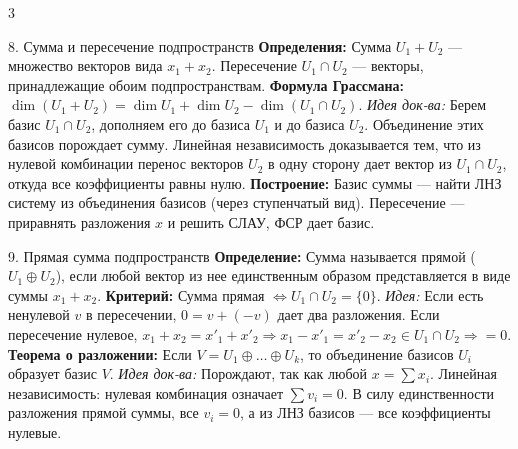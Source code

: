 \documentclass[8pt, a4paper, landscape]{extarticle}
\newcommand{\Ra}{\Rightarrow}
\begin{document}
\begin{multicols*}{3}
\begin{ticket}{8. Сумма и пересечение подпространств}
\textbf{Определения:} Сумма $U_1 + U_2$ --- множество векторов вида $x_1 + x_2$. Пересечение $U_1 \cap U_2$ --- векторы, принадлежащие обоим подпространствам.
\textbf{Формула Грассмана:} $\dim(U_1 + U_2) = \dim U_1 + \dim U_2 - \dim(U_1 \cap U_2)$.
\tcblower
\textit{Идея док-ва:} Берем базис $U_1 \cap U_2$, дополняем его до базиса $U_1$ и до базиса $U_2$. Объединение этих базисов порождает сумму. Линейная независимость доказывается тем, что из нулевой комбинации перенос векторов $U_2$ в одну сторону дает вектор из $U_1 \cap U_2$, откуда все коэффициенты равны нулю.
\textbf{Построение:} Базис суммы --- найти ЛНЗ систему из объединения базисов (через ступенчатый вид). Пересечение --- приравнять разложения $x$ и решить СЛАУ, ФСР дает базис.
\end{ticket}

\begin{ticket}{9. Прямая сумма подпространств}
\textbf{Определение:} Сумма называется прямой ($U_1 \oplus U_2$), если любой вектор из нее единственным образом представляется в виде суммы $x_1 + x_2$.
\textbf{Критерий:} Сумма прямая $\Leftrightarrow U_1 \cap U_2 = \{0\}$.
\textit{Идея:} Если есть ненулевой $v$ в пересечении, $0 = v + (-v)$ дает два разложения. Если пересечение нулевое, $x_1+x_2=x'_1+x'_2 \Ra x_1-x'_1=x'_2-x_2 \in U_1 \cap U_2 \Ra =0$.
\tcblower
\textbf{Теорема о разложении:}
Если $V = U_1 \oplus \dots \oplus U_k$, то объединение базисов $U_i$ образует базис $V$.
\textit{Идея док-ва:} Порождают, так как любой $x = \sum x_i$. Линейная независимость: нулевая комбинация означает $\sum v_i = 0$. В силу единственности разложения прямой суммы, все $v_i=0$, а из ЛНЗ базисов --- все коэффициенты нулевые.
\end{ticket}


\end{multicols*}
\end{document}
